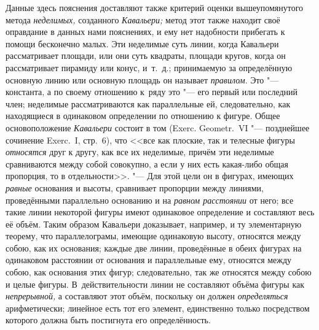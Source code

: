 Данные здесь пояснения доставляют также критерий оценки вышеупомянутого метода
{\em неделимых,} созданного {\em Кавальери;} метод этот также находит своё
оправдание в данных нами пояснениях, и ему нет надобности прибегать к помощи
бесконечно малых. Эти неделимые суть линии, когда Кавальери рассматривает
площади, или они суть квадраты, площади кругов, когда он рассматривает пирамиду
или конус, и~т.~д.; принимаемую за определённую основную линию или основную
площадь он называет {\em правилом}. Это "--- константа, а по своему отношению
к~ряду это "--- его первый или последний член; неделимые рассматриваются как
параллельные ей, следовательно, как находящиеся в одинаковом определении по
отношению к фигуре. Общее основоположение {\em Кавальери} состоит в том (Exerc.
Geo\-metr.~VI "--- позднейшее сочинение Exerc.~I, стр.~6), что <<все как
плоские, так и телесные фигуры {\em относятся} друг к другу, как все их
неделимые, причём эти неделимые сравниваются между собой
совокупно, а если у них есть какая-либо общая пропорция, то в отдельности>>.
"--- Для этой цели он в фигурах, имеющих {\em равные} основания и высоты,
сравнивает пропорции между линиями, проведёнными параллельно основанию и на
{\em равном расстоянии} от него; все такие линии некоторой фигуры имеют
одинаковое определение и составляют весь её объём. Таким образом Кавальери
доказывает, например, и ту элементарную теорему, что параллелограмы, имеющие
одинаковую высоту, относятся между собою, как их основания; каждые две линии,
проведённые в обеих фигурах на одинаковом расстоянии от основания и
параллельные ему, относятся между собою, как основания этих фигур;
следовательно, так же относятся между собою и целые фигуры. В~действительности
линии не составляют объёма фигуры как {\em непрерывной,} а составляют этот
объём, поскольку он должен {\em определяться} арифметически; линейное есть тот
его элемент, единственно только посредством которого должна быть постигнута его
определённость.

